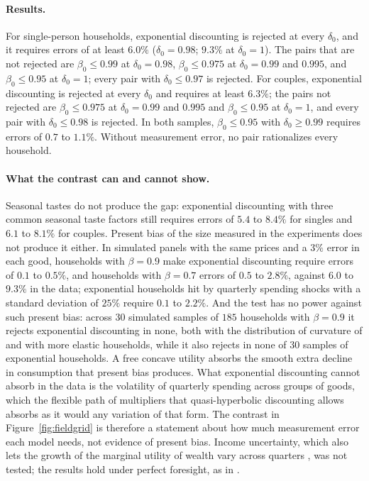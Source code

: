 \documentclass[11pt,a4paper]{article}
\theoremstyle{plain}
\theoremstyle{definition}
\begin{document}
\paragraph{Results.} For single-person households, exponential discounting is rejected at every $\delta_0$, and it
requires errors of at least $6.0\%$ ($\delta_0=0.98$; $9.3\%$ at $\delta_0=1$). The pairs that are not rejected are
$\beta_0\le0.99$ at $\delta_0=0.98$, $\beta_0\le0.975$ at $\delta_0=0.99$ and $0.995$, and $\beta_0\le0.95$ at
$\delta_0=1$; every pair with $\delta_0\le0.97$ is rejected. For couples, exponential discounting is rejected at
every $\delta_0$ and requires at least $6.3\%$; the pairs not rejected are $\beta_0\le0.975$ at $\delta_0=0.99$ and $0.995$ and $\beta_0\le0.95$ at
$\delta_0=1$, and every pair with $\delta_0\le0.98$ is rejected. In both samples, $\beta_0\le0.95$ with
$\delta_0\ge0.99$ requires errors of $0.7$ to $1.1\%$. Without measurement error, no pair rationalizes every
household.

\paragraph{What the contrast can and cannot show.} Seasonal tastes do not produce the gap: exponential discounting
with three common seasonal taste factors still requires errors of $5.4$ to $8.4\%$ for singles and $6.1$ to $8.1\%$
for couples. Present bias of the size measured in the experiments does not produce it either. In simulated panels
with the same prices and a $3\%$ error in each good, households with $\beta=0.9$ make exponential discounting require
errors of $0.1$ to $0.5\%$, and households with $\beta=0.7$ errors of $0.5$ to $2.8\%$, against $6.0$ to $9.3\%$ in the
data; exponential households hit by quarterly spending shocks with a standard deviation of $25\%$ require $0.1$ to
$2.2\%$. And the test has no power against such present bias: across $30$ simulated samples of $185$ households with
$\beta=0.9$ it rejects exponential discounting in none, both with the distribution of curvature of
\citet{aguiar2021} and with more elastic households, while it also rejects in none of $30$ samples of exponential
households. A free concave utility absorbs the smooth extra decline in consumption that present bias produces. What
exponential discounting cannot absorb in the data is the volatility of quarterly spending across groups of goods, which
the flexible path of multipliers that quasi-hyperbolic discounting allows absorbs as it would any variation of that
form. The contrast in Figure~\ref{fig:fieldgrid} is therefore a statement about how much measurement error each model
needs, not evidence of present bias. Income uncertainty, which also lets the growth of the marginal utility of wealth
vary across quarters \citep[Appendix~E.1]{aguiar2021}, was not tested; the results hold under perfect foresight, as
in \citet{bbc2021}.
\end{document}

